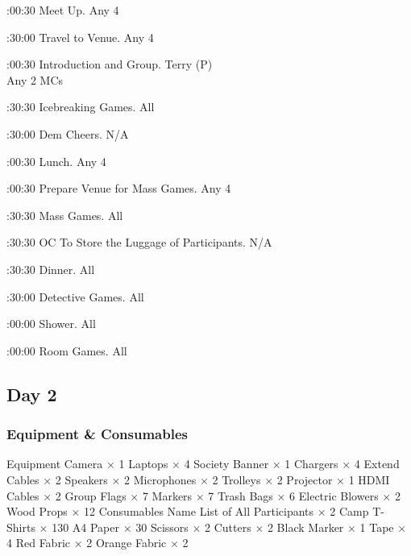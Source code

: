 \bTR{}:00:30
\eTD\bTD Meet Up.
\eTD\bTD Any 4
\eTD\eTR

\bTR{}:30:00
\eTD\bTD Travel to Venue.
\eTD\bTD Any 4
\eTD\eTR

\bTR{}:00:30
\eTD\bTD Introduction and Group.
\eTD\bTD Terry (P) \\ Any 2 MCs
\eTD\eTR

\bTR{}:30:30
\eTD\bTD Icebreaking Games.
\eTD\bTD All
\eTD\eTR

\bTR{}:30:00
\eTD\bTD Dem Cheers.
\eTD\bTD N/A
\eTD\eTR

\bTR{}:00:30
\eTD\bTD Lunch.
\eTD\bTD Any 4
\eTD\eTR

\bTR{}:00:30
\eTD\bTD Prepare Venue for Mass Games.
\eTD\bTD Any 4
\eTD\eTR

\bTR{}:30:30
\eTD\bTD Mass Games.
\eTD\bTD All
\eTD\eTR

\bTR{}:30:30
\eTD\bTD OC To Store the Luggage of Participants.
\eTD\bTD N/A
\eTD\eTR

\bTR{}:30:30
\eTD\bTD Dinner.
\eTD\bTD All
\eTD\eTR

\bTR{}:30:00
\eTD\bTD Detective Games.
\eTD\bTD All
\eTD\eTR

\bTR{}:00:00
\eTD\bTD Shower.
\eTD\bTD All
\eTD\eTR

\bTR{}:00:00
\eTD\bTD Room Games.
\eTD\bTD All
\eTD\eTR

\eTABLEbody
\eTABLE

\subsection{Day 2}

\subsubsection{Equipment \& Consumables}
\starttabulate[|l|l|]
\NC{}Equipment\NC\NR
\HL
\NC Camera \NC $\times$ 1 \NR
\NC Laptops \NC $\times$ 4 \NR
\NC Society Banner \NC $\times$ 1 \NR
\NC Chargers \NC $\times$ 4 \NR
\NC Extend Cables \NC $\times$ 2 \NR
\NC Speakers \NC $\times$ 2 \NR
\NC Microphones \NC $\times$ 2 \NR
\NC Trolleys \NC $\times$ 2 \NR
\NC Projector \NC $\times$ 1 \NR
\NC HDMI Cables \NC $\times$ 2 \NR
\NC Group Flags \NC $\times$ 7 \NR
\NC Markers \NC $\times$ 7 \NR
\NC Trash Bags \NC $\times$ 6 \NR
\NC Electric Blowers \NC $\times$ 2 \NR
\NC Wood Props \NC $\times$ 12 \NR
\HL
\NR
\NC{}Consumables\NC\NR
\HL
\NC Name List of All Participants \NC $\times$ 2 \NR
\NC Camp T-Shirts \NC $\times$ 130 \NR
\NC A4 Paper \NC $\times$ 30 \NR
\NC Scissors \NC $\times$ 2 \NR
\NC Cutters \NC $\times$ 2 \NR
\NC Black Marker \NC $\times$ 1 \NR
\NC Tape \NC $\times$ 4 \NR
\NC Red Fabric \NC $\times$ 2 \NR
\NC Orange Fabric \NC $\times$ 2 \NR
\HL
\stoptabulate

